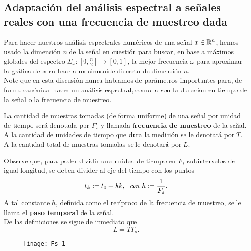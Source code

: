 \subsection{Adaptación del análisis espectral a señales reales con una frecuencia de muestreo dada}

Para hacer nuestros análisis espectrales
numéricos de una señal $x \in \mathbb{R}^{n}$, hemos
usado la dimensión $n$ de la señal en cuestión 
para buscar, en base a máximos globales
del espectro 
$\Sigma_{x}: [0, \frac{n}{2}] \longrightarrow [0,1]$, la
mejor frecuencia $\omega$ para aproximar la gráfica
de $x$ en base a un sinusoide discreto
de dimensión $n$. \\

Note que en esta discusión nunca hablamos de 
parámetros importantes para, de forma canónica, hacer
un análisis espectral, como lo son la
duración en tiempo de la señal o la frecuencia
de muestreo.

\begin{defi}
\label{def: tiempo y frec de muestreo}
La cantidad de muestras tomadas (de forma uniforme)
de una señal por unidad de tiempo 
será denotada por $F_{s}$ y llamada \textbf{frecuencia
de muestreo} de la señal. A la cantidad de unidades de
tiempo que dura la medición se le denotará por $T$. 
A la cantidad total de muestras tomadas se le denotará
por $L$.
\end{defi}
Observe que, para poder dividir una unidad
de tiempo en $F_{s}$ subintervalos de igual longitud,
se deben divider al eje del tiempo con los puntos
\begin{equation}
t_{k} := t_{0} + h k, \hspace{0.2cm}
\textit{con } h := \frac{1}{F_{s}}.
\end{equation}
A tal constante $h$, definida como el recíproco de la frecuencia
de muestreo, se le llama el \textbf{paso temporal} de la señal. \\

De las definiciones se sigue de inmediato que
\begin{equation}
\label{eq: relacion L, T Fs}
L = T F_{s}.
\end{equation}
\begin{figure}[H]
	\centering
	\texttt{[image: Fs\_1]} 
\end{figure}	

